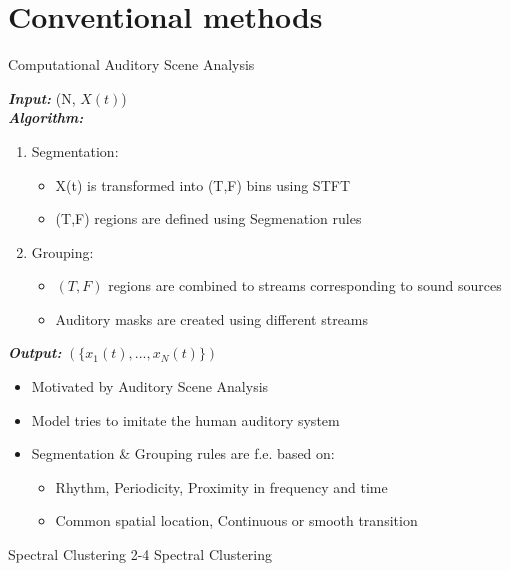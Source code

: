 \documentclass[xcolor=table,mathserif,9pt]{beamer}    %
\begin{document}
\section{Conventional methods}%
\label{sec:conventional_methods}
\begin{frame}{Computational Auditory Scene Analysis \cite{CASABrown}}

\begin{algorithm}[H]
	\LinesNumbered
	\emph{\textbf{Input: }}(N, $X(t)$) \\
	\emph{\textbf{Algorithm: }}
	\begin{enumerate}
		\item Segmentation:
			\begin{itemize}
				\item \small{ X(t) is transformed into (T,F) bins using STFT }
				\item (T,F) regions are defined using Segmenation rules 
			\end{itemize}
		\item Grouping:
			\begin{itemize}
				\item \small{ $(T,F)$ regions are combined to streams corresponding to sound sources}
				\item Auditory masks are created using different streams
			\end{itemize}
	\end{enumerate}
	\emph{\textbf{Output: }}$(\{x_1(t), ..., x_N(t)\})$
\end{algorithm}
	\vspace{10mm}
\begin{itemize}
	\item Motivated by Auditory Scene Analysis \cite{bregman}
	\item Model tries to imitate the human auditory system
	\item Segmentation \& Grouping rules are f.e. based on:
	\begin{itemize}
		\item Rhythm, Periodicity, Proximity in frequency and time
		\item Common spatial location, Continuous or smooth transition
	\end{itemize}
\end{itemize}

\end{frame}

\begin{frame}{Spectral Clustering}
	2-4 Spectral Clustering
\end{frame}
\end{document}
